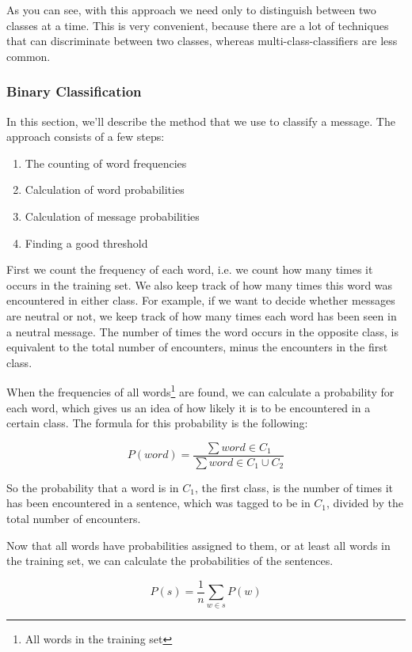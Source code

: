 \documentclass[11pt]{article}
\begin{document}
As you can see, with this approach we need only to distinguish between two classes at a time. This is very convenient, because there are a lot of techniques that can discriminate between two classes, whereas multi-class-classifiers are less common.

\subsubsection{Binary Classification}
In this section, we'll describe the method that we use to classify a message. The approach consists of a few steps:
\begin{enumerate}
\item The counting of word frequencies
\item Calculation of word probabilities
\item Calculation of message probabilities
\item Finding a good threshold
\end{enumerate}

First we count the frequency of each word, i.e. we count how many times it occurs in the training set. We also keep track of how many times this word was encountered in either class. For example, if we want to decide whether messages are neutral or not, we keep track of how many times each word has been seen in a neutral message. The number of times the word occurs in the opposite class, is equivalent to the total number of encounters, minus the encounters in the first class.

When the frequencies of all words\footnote{All words in the training set} are found, we can calculate a probability for each word, which gives us an idea of how likely it is to be encountered in a certain class. The formula for this probability is the following:

\begin{equation}
P(word) = \frac{ \sum word \in C_1}{\sum word \in C_1\cup C_2}
\end{equation}

So the probability that a word is in $C_1$, the first class, is the number of times it has been encountered in a sentence, which was tagged to be in $C_1$, divided by the total number of encounters.

Now that all words have probabilities assigned to them, or at least all words in the training set, we can calculate the probabilities of the sentences.

\begin{equation}
P(s) = \frac{1}{n} \sum_{w \in s} P(w)
\end{equation}
\end{document}
